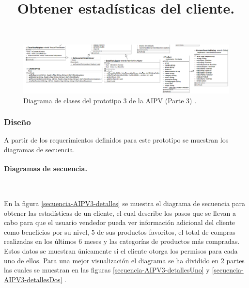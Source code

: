 \FloatBarrier
\begin{figure}[htbp!]
		\centering
			\includegraphics[width=1 \textwidth]{imagenes/adrian/vendedor/prototipo3/clases_3}
		\caption{Diagrama de clases del prototipo 3 de la AIPV (Parte 3) .}
		\label{clases-AIPV3-parte3}
\end{figure}
\FloatBarrier

\subsubsection{Diseño}

A partir de los requerimientos definidos para este prototipo se muestran los diagramas de secuencia.\\ \par

\paragraph{Diagramas de secuencia.} ~\\

\title{\textbf{Obtener estadísticas del cliente.}\\}

En la figura \ref{secuencia-AIPV3-detalles} se muestra el diagrama de secuencia para obtener las estadísticas de un cliente, el cual describe los pasos que se llevan a cabo para que el usuario vendedor pueda ver información adicional del cliente como beneficios por su nivel, 5 de sus productos favoritos, el total de compras realizadas en los últimos 6 meses y las categorías de productos más compradas. Estos datos se muestran únicamente si el cliente otorga los permisos para cada uno de ellos. Para una mejor visualización el diagrama se ha dividido en 2 partes las cuales se muestran en las figuras \ref{secuencia-AIPV3-detallesUno} y \ref{secuencia-AIPV3-detallesDos} .

